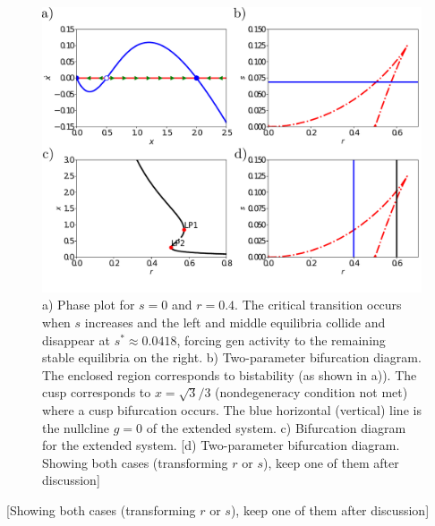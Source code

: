 \documentclass[12pt]{article}
\begin{document}
\begin{figure}
    \begin{center}
    \includegraphics[width=0.98\linewidth]{figures/ApplicationGen.pdf}
    \end{center}
    \caption{a) Phase plot for $s=0$ and $r=0.4$. The critical transition occurs when $s$ increases and the left and middle equilibria collide and disappear at $s^*\approx 0.0418$, forcing gen activity to the remaining stable equilibria on the right. b) Two-parameter bifurcation diagram. The enclosed region corresponds to bistability (as shown in a)). The cusp corresponds to $x=\sqrt{3}/3$ (nondegeneracy condition not met) where a cusp bifurcation occurs. The blue horizontal (vertical) line is the nullcline $g=0$ of the extended system. c) Bifurcation diagram for the extended system. [d) Two-parameter bifurcation diagram. Showing both cases (transforming $r$ or $s$), keep one of them after discussion]}
    \label{fig:Example:GenActivation}
\end{figure}

[Showing both cases (transforming $r$ or $s$), keep one of them after discussion]
\end{document}
